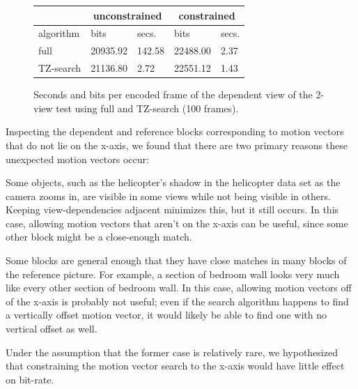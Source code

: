 \documentclass{sig-alternate-05-2015}
\begin{document}
\begin{figure}[h]
\centering\small
\begin{tabular}{|l|l|l|l|l|}
\multicolumn{1}{c}{} & \multicolumn{2}{c}{unconstrained} & \multicolumn{2}{c}{constrained} \\ \hline
algorithm            & bits            & secs.           & bits            & secs.         \\ \hline
full                 & 20935.92        & 142.58          & 22488.00        & 2.37          \\ \hline
TZ-search            & 21136.80        & 2.72            & 22551.12        & 1.43          \\ \hline
\end{tabular}
\caption{Seconds and bits per encoded frame of the dependent view of the
2-view test using full and TZ-search (100 frames).}
\label{fig:time-full-fast}
\end{figure}

Inspecting the dependent and reference blocks corresponding to motion vectors
that do not lie on the x-axis, we found that there are two primary reasons these
unexpected motion vectors occur: \begin{compactitem}
\item Some objects, such as the helicopter's shadow in the helicopter data set
as the camera zooms in, are visible in some views while not being visible in
others. Keeping view-dependencies adjacent minimizes this, but it still occurs.
In this case, allowing motion vectors that aren't on the x-axis can be useful,
since some other block might be a close-enough match.
\item Some blocks are general enough that they have close matches in many blocks
of the reference picture. For example, a section of bedroom wall looks very much
like every other section of bedroom wall. In this case, allowing motion vectors
off of the x-axis is probably not useful; even if the search algorithm happens
to find a vertically offset motion vector, it would likely be able to find one
with no vertical offset as well. \end{compactitem} Under the assumption that the
former case is relatively rare, we hypothesized that constraining the motion
vector search to the x-axis would have little effect on bit-rate.
\end{document}
